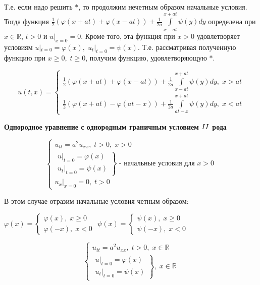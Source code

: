 Т.е. если надо решить $*$, то продолжим нечетным образом начальные условия. Тогда функция $\frac{1}{2} \left( \varphi(x+at) + \varphi(x-at) \right) + \frac{1}{2a} \underset{x-at}{\overset{x+at}{\int}} \psi(y) dy$ определена при $x \in \mathbb{R}$, $t>0$ и $u|_{x=0} = 0$. Кроме того, эта функция при $x>0$ удовлетворяет условиям $u|_{t=0} = \varphi(x), \; u_t |_{t=0} = \psi (x)$. Т.е. рассматривая полученную функцию при $x \ge 0, \; t \ge 0$, получим функцию, удовлетворяющую $*$.

$$u(t,x) = \begin{cases}
	\frac{1}{2} \left( \varphi(x+at) + \varphi(x-at) \right) + \frac{1}{2a} \underset{x-at}{\overset{x+at}{\int}} \psi(y) dy, \; x > at \\
	\frac{1}{2} \left( \varphi(x+at) - \varphi(at-x) \right) + \frac{1}{2a} \underset{at-x}{\overset{x+at}{\int}} \psi(y) dy, \; x < at
\end{cases}$$

\textbf{Однородное уравнение с однородным граничным условием $\RNumb{2}$ рода}

$$\begin{cases}
	u_{tt} = a^2 u_{xx}, \; t > 0, \; x > 0 \\
	\left.
  		\begin{array}{ccc}
    		u|_{t=0} = \varphi(x) \\
    		u_t |_{t=0} = \psi (x)
  		\end{array}
	\right\} \text{ - начальные условия для } x > 0 \\
	u_x |_{x=0} = 0, \; t > 0
\end{cases}$$

В этом случае отразим начальные условия четным образом:

\begin{multicols}{2}
	$\varphi (x) = 
		\begin{cases}
			\varphi (x), \; x \ge 0 \\
			\varphi (-x), \; x < 0
		\end{cases}$
	\columnbreak
	$\psi (x) = 
		\begin{cases}
			\psi (x), \; x \ge 0 \\
			\psi (-x), \; x < 0
		\end{cases}$
\end{multicols}

$$\begin{cases}
	u_{tt} = a^2 u_{xx}, \; t > 0, \; x \in \mathbb{R} \\
	\left.
  		\begin{array}{ccc}
    		u|_{t=0} = \varphi(x) \\
    		u_t |_{t=0} = \psi (x)
  		\end{array}
	\right\}, \; x \in \mathbb{R}
\end{cases}$$

